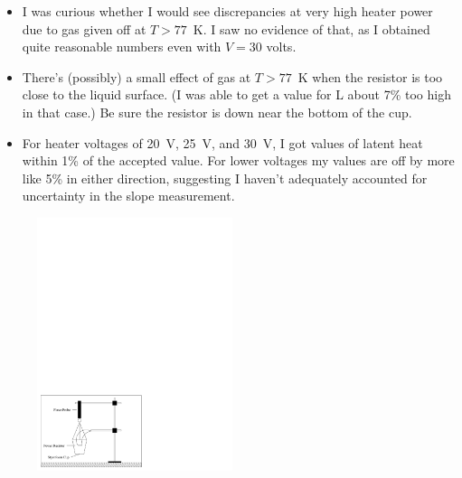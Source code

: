{\begin{itemize}[nosep]
\item I was curious whether I would see discrepancies at very high heater power due to gas given off at $T > 77$~K.  I saw no evidence of that, as I obtained quite reasonable numbers even with $V=30$ volts.

\item There's (possibly) a small effect of gas at $T>77$~K when the resistor is too close to the liquid surface.  (I was able to get a value for L about 7\% too high in that case.)  Be sure the resistor is down near the bottom of the cup.

\item For heater voltages of 20~V, 25~V, and 30~V, I got values of latent heat within 1\% of the accepted value.  For lower voltages my values are off by more like 5\% in either direction, suggesting I haven't adequately accounted for uncertainty in the slope measurement.
\end{itemize}
}

\makelabheader %

\bigskip

\begin{figure}
    \vspace{0.1in}
    \includegraphics[width=0.51\textwidth]{latent_heat_of_vaporization_of_nitrogen/heat_vap_nit_fig_1.pdf}
\end{figure}

\bigskip

